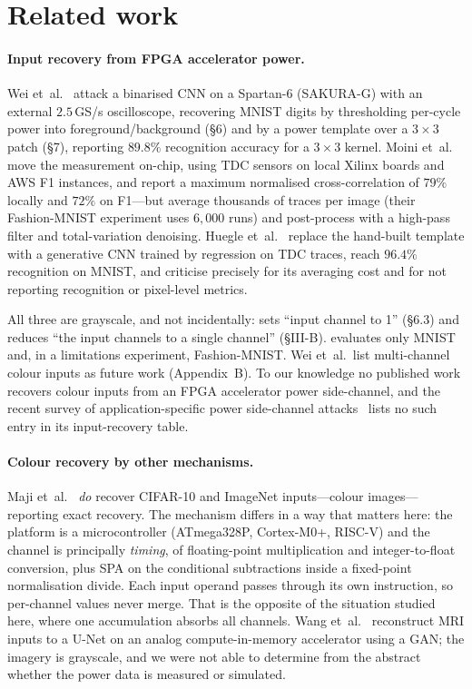 \documentclass[10pt,conference]{article}
\begin{document}
\section{Related work}

\paragraph{Input recovery from FPGA accelerator power.} Wei et~al.~\cite{wei2018} attack
a binarised CNN on a Spartan-6 (SAKURA-G) with an external $2.5$\,GS/s oscilloscope,
recovering MNIST digits by thresholding per-cycle power into foreground/background
(\S6) and by a power template over a $3\times3$ patch (\S7), reporting $89.8\%$
recognition accuracy for a $3\times3$ kernel. Moini et~al.~\cite{moini2021} move the
measurement on-chip, using TDC sensors on local Xilinx boards and AWS F1 instances, and
report a maximum normalised cross-correlation of $79\%$ locally and $72\%$ on F1---but
average thousands of traces per image (their Fashion-MNIST experiment uses $6{,}000$
runs) and post-process with a high-pass filter and total-variation denoising. Huegle
et~al.~\cite{huegle2023} replace the hand-built template with a generative CNN trained
by regression on TDC traces, reach $96.4\%$ recognition on MNIST, and criticise
\cite{moini2021} precisely for its averaging cost and for not reporting recognition or
pixel-level metrics.

All three are grayscale, and not incidentally: \cite{wei2018} sets ``input channel to
1'' (\S6.3) and \cite{huegle2023} reduces ``the input channels to a single channel''
(\S III-B). \cite{moini2021} evaluates only MNIST and, in a limitations experiment,
Fashion-MNIST. Wei et~al.\ list multi-channel colour inputs as future work
(Appendix~B). To our knowledge no published work recovers colour inputs from an FPGA
accelerator power side-channel, and the recent survey of application-specific power
side-channel attacks~\cite{sanjaya2024} lists no such entry in its input-recovery
table.

\paragraph{Colour recovery by other mechanisms.} Maji et~al.~\cite{maji2021} \emph{do}
recover CIFAR-10 and ImageNet inputs---colour images---reporting exact recovery. The
mechanism differs in a way that matters here: the platform is a microcontroller
(ATmega328P, Cortex-M0+, RISC-V) and the channel is principally \emph{timing}, of
floating-point multiplication and integer-to-float conversion, plus SPA on the
conditional subtractions inside a fixed-point normalisation divide. Each input operand
passes through its own instruction, so per-channel values never merge. That is the
opposite of the situation studied here, where one accumulation absorbs all channels.
Wang et~al.~\cite{wang2023} reconstruct MRI inputs to a U-Net on an analog
compute-in-memory accelerator using a GAN; the imagery is grayscale, and we were not
able to determine from the abstract whether the power data is measured or simulated.
\end{document}
